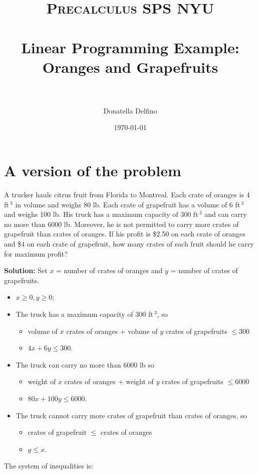 \documentclass[paper=a4, fontsize=11pt]{scrartcl} %
\title{	
\normalfont \normalsize 
\textsc{Precalculus \MVAt
 SPS NYU} \\ [25pt] %
\horrule{0.5pt} \\[0.4cm] %
\Large Linear Programming Example: Oranges and Grapefruits \\ %
\horrule{1pt} \\[0.5cm] %
}
\author{Donatella Delfino} %
\date{\normalsize\today} %
\numberwithin{equation}{section} %
\numberwithin{figure}{section} %
\numberwithin{table}{section} %
\begin{document}
\maketitle %


\section{A version of the problem}

A trucker hauls citrus fruit from Florida to Montreal. Each crate of oranges is 4 ft$\,^3$ in volume and weighs 80 lb. Each crate of grapefruit has a volume of 6 ft$\,^3$ and weighs 100 lb. His truck has a maximum capacity of 300 ft$\,^3$ and can carry no more than 6000 lb. Moreover, he is not permitted to carry more crates of grapefruit than crates of oranges. If his profit is \$2.50 on each crate of oranges and \$4 on each crate of grapefruit, how many crates of each fruit should he carry for maximum profit?

{\bf{Solution:}} Set $x$ = number of crates of oranges and $y$ = number of crates of grapefruits. 
\begin{itemize}
\item $x\geq 0,y\geq 0$;
\item The truck has a maximum capacity of 300 ft$\,^3$, so 
\begin{itemize}
\item volume of $x$ crates of oranges + volume of $y$ crates of grapefruits $\leq 300$
\item $\displaystyle 4x+6y\leq 300$.
\end{itemize}
\item The truck can carry no more than 6000 lb so 
\begin{itemize}
\item weight of $x$ crates of oranges + weight of $y$ crates of grapefruits $\leq 6000$
\item $\displaystyle 80x+100y\leq 6000$.
\end{itemize}
\item The truck cannot carry more crates of grapefruit than crates of oranges, so
\begin{itemize}
\item crates of grapefruit $\leq$ crates of oranges
\item $\displaystyle y \leq x$.
\end{itemize}
\end{itemize} 
The system of inequalities is:
\end{document}
